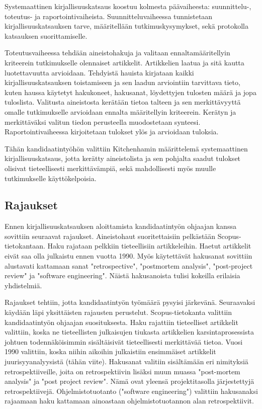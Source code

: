 Systemaattinen kirjallisuuskatsaus koostuu kolmesta päävaiheesta: suunnittelu-, toteutus- ja raportointivaiheista. Suunnitteluvaiheessa tunnistetaan kirjallisuuskatsauksen tarve, määritellään tutkimuskysymykset, sekä protokolla katsauksen suorittamiselle. \citep{Kitchenham2007}

Toteutusvaiheessa tehdään aineistohakuja ja valitaan ennaltamääritellyin kriteerein tutkimukselle olennaiset artikkelit. Artikkelien laatua ja sitä kautta luotettavuutta arvioidaan. Tehdyistä hauista kirjataan kaikki kirjallisuuskatsauksen toistamiseen ja sen laadun arviointiin tarvittava tieto, kuten haussa käytetyt hakukoneet, hakusanat, löydettyjen tulosten määrä ja jopa tuloslista. Valitusta aineistosta kerätään tietoa talteen ja sen merkittävyyttä omalle tutkimukselle arvioidaan ennalta määritellyin kriteerein. Kerätyn ja merkittäväksi valitun tiedon perusteella muodostetaan synteesi. Raportointivaiheessa kirjoitetaan tulokset ylös ja arvioidaan tuloksia. \citep{Kitchenham2007}

Tähän kandidaatintyöhön valittiin Kitchenhamin määrittelemä systemaattinen kirjallisuuskatsaus, jotta kerätty aineistolista ja sen pohjalta saadut tulokset olisivat tieteellisesti merkittävämpiä, sekä mahdollisesti myös muulle tutkimukselle käyttökelpoisia.

\subsection{Rajaukset}
Ennen kirjallisuuskatsauksen aloittamista kandidaatintyön ohjaajan kanssa sovittiin seuraavat rajaukset. Aineistohaut suoritettaisiin pelkästään Scopus-tietokantaan. Haku rajataan pelkkiin tieteellisiin artikkeleihin. Haetut artikkelit eivät saa olla julkaistu ennen vuotta 1990. Myös käytettävät hakusanat sovittiin alustavati kattamaan sanat "retrospective",  "postmortem analysis", "post-project review" ja "software engineering". Näistä hakusanoista tulisi kokeilla erilaisia yhdistelmiä.

Rajaukset tehtiin, jotta kandidaatintyön työmäärä pysyisi järkevänä. Seuraavaksi käydään läpi yksittäisten rajausten perustelut. Scopus-tietokanta valittiin kandidaatintyön ohjaajan suosituksesta. Haku rajattiin tieteelliset artikkelit valittiin, koska ne tieteellisten julkaisujen tiukasta artikkelien karsintaprosessista johtuen todennäköisimmin sisältäisivät tieteellisesti merkittävää tietoa. Vuosi 1990 valittiin, koska niihin aikoihin julkaistiin ensimmäiset artikkelit juurisyyanalyysistä (tähän viite). Hakusanat valitiin sisältämään eri nimityksiä retrospektiiveille, joita on retrospektiivin lisäksi muun muassa "post-mortem analysis" ja "post project review". Nämä ovat yleensä projektitasolla järjestettyjä retrospektiivejä. Ohjelmistotuotanto ("software engineering") valittiin hakusanaksi rajaamaan haku kattamaan ainoastaan ohjelmistotuotannon alan retrospektiivit.

